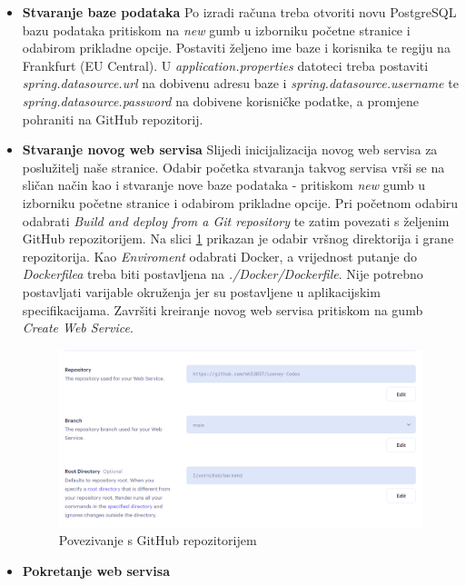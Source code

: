 \begin{itemize}
	\item \textbf{Stvaranje baze podataka} \newline
	Po izradi računa treba otvoriti novu PostgreSQL bazu podataka pritiskom na \textit{new} gumb u izborniku početne stranice i odabirom prikladne opcije. Postaviti željeno ime baze i korisnika te regiju na Frankfurt (EU Central). U \textit{application.properties} datoteci treba postaviti \textit{spring.datasource.url} na dobivenu adresu baze i \textit{spring.datasource.username} te \textit{spring.datasource.password} na dobivene korisničke podatke, a promjene pohraniti na GitHub repozitorij.
	\item \textbf{Stvaranje novog web servisa} \newline
	Slijedi inicijalizacija novog web servisa za poslužitelj naše stranice. Odabir početka stvaranja takvog servisa vrši se na sličan način kao i stvaranje nove baze podataka - pritiskom \textit{new} gumb u izborniku početne stranice i odabirom prikladne opcije.  \newline
	Pri početnom odabiru odabrati \textit{Build and deploy from a Git repository} te zatim povezati s željenim GitHub repozitorijem. Na slici \ref{deployment3} prikazan je odabir vršnog direktorija i grane repozitorija. Kao \textit{Enviroment} odabrati Docker, a vrijednost putanje do \textit{Dockerfilea} treba biti postavljena na \textit{./Docker/Dockerfile}. Nije potrebno postavljati varijable okruženja jer su postavljene u aplikacijskim specifikacijama. Završiti kreiranje novog web servisa pritiskom na gumb \textit{Create Web Service}.
	\begin{figure}[H]
		\includegraphics[scale=0.3]{slike/deployment3.png}
		\centering
		\caption{Povezivanje s GitHub repozitorijem}
		\label{deployment3}
	\end{figure}
	\item \textbf{Pokretanje web servisa}

\end{itemize}

